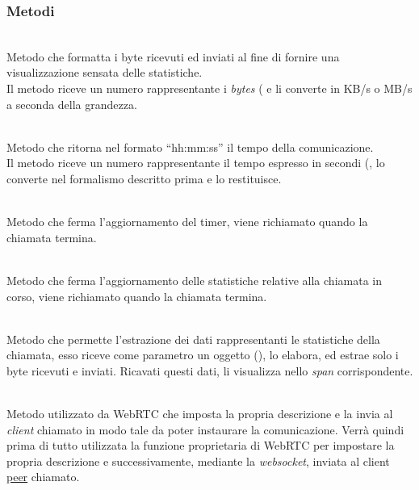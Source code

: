 \subsubsection*{Metodi}
\begin{description}
\item{}\\
Metodo che formatta i byte ricevuti ed inviati al fine di fornire una visualizzazione sensata delle statistiche.\\
Il metodo riceve un numero rappresentante i \textit{bytes} ( e li converte in KB/s o MB/s a seconda della grandezza.

\item{}\\
Metodo che ritorna nel formato ``hh:mm:ss'' il tempo della comunicazione.\\
Il metodo riceve un numero rappresentante il tempo espresso in secondi (, lo converte nel formalismo descritto prima e lo restituisce.

\item{}\\
Metodo che ferma l'aggiornamento del timer, viene richiamato quando la chiamata termina.

\item{}\\
Metodo che ferma l'aggiornamento delle statistiche relative alla chiamata in corso, viene richiamato quando la chiamata termina.

\item{}\\
 Metodo che permette l'estrazione dei dati rappresentanti le statistiche della chiamata, esso riceve come parametro un oggetto (), lo elabora, ed estrae solo i byte ricevuti e inviati. Ricavati questi dati, li visualizza nello \textit{span} corrispondente.
 
\item{}\\
Metodo utilizzato da WebRTC che imposta la propria descrizione e la invia al \textit{client} chiamato in modo tale da poter instaurare la comunicazione. Verrà quindi prima di tutto utilizzata la funzione proprietaria di WebRTC  per impostare la propria descrizione e successivamente, mediante la \textit{websocket}, inviata al client \underline{peer} chiamato.
 

\end{description}
